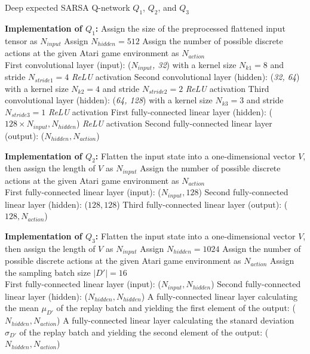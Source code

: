 \documentclass{article}
\begin{document}
\begin{algorithm}

  \caption{Deep expected SARSA Q-network $Q_1$, $Q_2$, and $Q_3$}

  \begin{algorithmic}
    
    \State \textbf{Implementation of $Q_1$:}
    \State Assign the size of the preprocessed flattened input tensor as $N_{input}$
    \State Assign $N_{hidden} = 512$
    \State Assign the number of possible discrete actions at the given Atari game environment as $N_{action}$
    \\
    \State First convolutional layer (input): (\textit{$N_{input}$, 32}) with a kernel size $N_{k1}=8$ and stride $N_{stride1}=4$
    \State \textit{ReLU} activation
    \State Second convolutional layer (hidden): (\textit{32, 64}) with a kernel size $N_{k2}=4$ and stride $N_{stride2}=2$
    \State \textit{ReLU} activation
    \State Third convolutional layer (hidden): (\textit{64, 128}) with a kernel size $N_{k3}=3$ and stride $N_{stride3}=1$
    \State \textit{ReLU} activation
    \State First fully-connected linear layer (hidden): ($128 \times N_{input}, N_{hidden}$)
    \State \textit{ReLU} activation
    \State Second fully-connected linear layer (output): ($N_{hidden}, N_{action}$)
  
  \end{algorithmic} 

  \begin{algorithmic}
    \State \textbf{Implementation of $Q_2$:}
    \State Flatten the input state into a one-dimensional vector $V$, then assign the length of $V$ as $N_{input}$ 
    \State Assign the number of possible discrete actions at the given Atari game environment as $N_{action}$
    \\
    \State First fully-connected linear layer (input): ($N_{input}, 128$)
    \State Second fully-connected linear layer (hidden): ($128, 128$)
    \State Third fully-connected linear layer (output): ($128, N_{action}$)
  \end{algorithmic} 

  \begin{algorithmic}
    \State \textbf{Implementation of $Q_3$:}
    \State Flatten the input state into a one-dimensional vector $V$, then assign the length of $V$ as $N_{input}$ 
    \State Assign $N_{hidden} = 1024$
    \State Assign the number of possible discrete actions at the given Atari game environment as $N_{action}$
    \State Assign the sampling batch size $\mid {D'}\mid = 16$
    \\
    \State First fully-connected linear layer (input): ($N_{input}, N_{hidden}$)
    \State Second fully-connected linear layer (hidden): ($N_{hidden}, N_{hidden}$)
    \State A fully-connected linear layer calculating the mean $\mu_{D'}$ of the replay batch and yielding the first element of the output: ($N_{hidden}, N_{action}$)
    \State A fully-connected linear layer calculating the stanard deviation $\sigma_{D'}$ of the replay batch and yielding the second element of the output: ($N_{hidden}, N_{action}$)


\end{algorithmic}
\end{algorithm}
\end{document}
